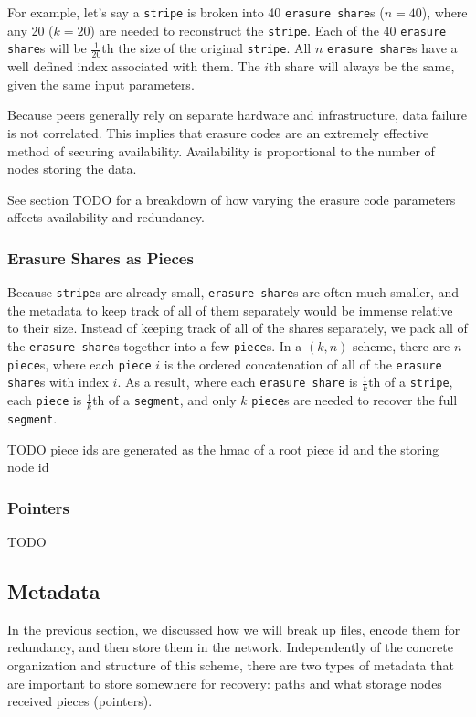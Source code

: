 \documentclass[a4paper,10pt]{article} \usepackage[utf8]{inputenc}
\newcommand{\x}[1]{{\tt #1}} \newcommand{\code}[1]{{\tt #1}}
\newcommand{\todo}[1]{{\color{red} TODO #1 }}
\begin{document}
For example, let's say a \x{stripe} is broken into 40 \x{erasure share}s
($n=40$), where any 20 ($k=20$) are needed to reconstruct the \x{stripe}. Each
of the 40 \x{erasure share}s will be $\frac{1}{20}$th the size of the original
\x{stripe}. All $n$ \x{erasure share}s have a well defined index associated
with them. The $i$th share will always be the same, given the same input
parameters.

Because peers generally rely on separate hardware and infrastructure, data
failure is not correlated. This implies that erasure codes are an extremely
effective method of securing availability. Availability is proportional to the
number of nodes storing the data.

See section \todo{} for a breakdown of how varying the erasure code parameters
affects availability and redundancy.

\subsubsection{Erasure Shares as Pieces}

Because \x{stripe}s are already small, \x{erasure share}s are often much
smaller, and the metadata to keep track of all of them separately would be
immense relative to their size. Instead of keeping track of all of the shares
separately, we pack all of the \x{erasure share}s together into a few
\x{piece}s. In a $(k, n)$ scheme, there are $n$ \x{piece}s, where each
\x{piece} $i$ is the ordered concatenation of all of the \x{erasure share}s with
index $i$. As a result, where each \x{erasure share} is $\frac{1}{k}$th of a
\x{stripe}, each \x{piece} is $\frac{1}{k}$th of a \x{segment}, and only $k$
\x{piece}s are needed to recover the full \x{segment}.

\todo{piece ids are generated as the hmac of a root piece id and the storing
node id}

\subsubsection{Pointers}

\todo{}

\subsection{Metadata}

In the previous section, we discussed how we will break up files, encode them
for redundancy, and then store them in the network. Independently of the
concrete organization and structure of this scheme, there are two types of
metadata that are important to store somewhere for recovery: paths and what
storage nodes received pieces (pointers).
\end{document}
